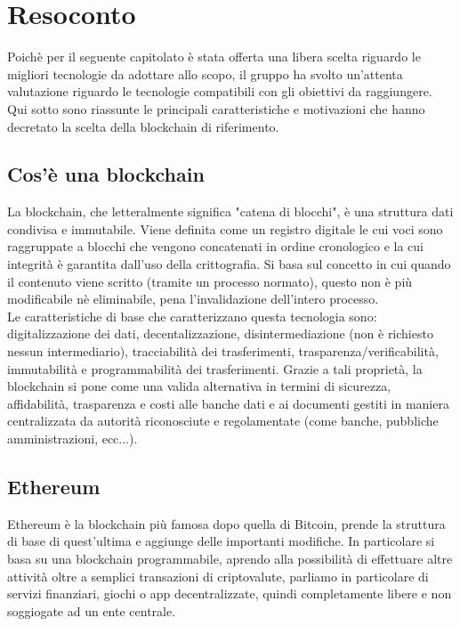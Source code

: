 \section{Resoconto}

Poichè per il seguente capitolato è stata offerta una libera scelta riguardo le migliori tecnologie da adottare allo scopo, il gruppo ha svolto un'attenta valutazione
riguardo le tecnologie compatibili con gli obiettivi da raggiungere.
Qui sotto sono riassunte le principali caratteristiche e motivazioni che hanno decretato la scelta della blockchain di riferimento.

\subsection{Cos'è una blockchain}
La blockchain, che letteralmente significa "catena di blocchi", è una struttura dati condivisa e
immutabile. Viene definita come un registro digitale le cui voci sono raggruppate a blocchi che
vengono concatenati in ordine cronologico e la cui integrità è garantita dall'uso della crittografia.
Si basa sul concetto in cui quando il contenuto viene scritto (tramite un processo normato), questo non
è più modificabile nè eliminabile, pena l'invalidazione dell'intero processo.\\
Le caratteristiche di base che caratterizzano questa tecnologia sono: digitalizzazione dei dati, decentalizzazione,
disintermediazione (non è richiesto nessun intermediario), tracciabilità dei trasferimenti, trasparenza/verificabilità,
immutabilità e programmabilità dei trasferimenti. Grazie a tali proprietà, la blockchain si pone come una valida
alternativa in termini di sicurezza, affidabilità, trasparenza e costi alle banche dati e ai documenti gestiti in maniera
centralizzata da autorità riconosciute e regolamentate (come banche, pubbliche amministrazioni, ecc...).

\subsection{Ethereum}
Ethereum è la blockchain più famosa dopo quella di Bitcoin\glo, prende la struttura di base di quest'ultima e aggiunge delle
importanti modifiche. In particolare si basa su una blockchain programmabile, aprendo alla possibilità di effettuare altre attività
oltre a semplici transazioni di criptovalute, parliamo in particolare di servizi finanziari, giochi o app decentralizzate, quindi
completamente libere e non soggiogate ad un ente centrale.

